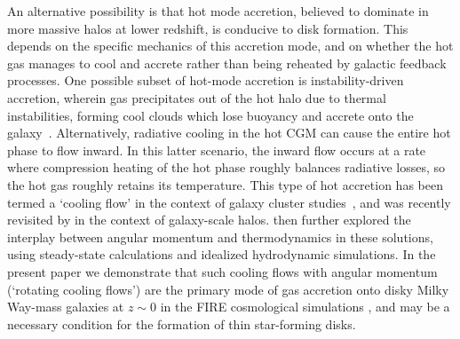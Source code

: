 \documentclass[fleqn,usenatbib]{mnras}
\begin{document}
An alternative possibility is that hot mode accretion, believed to dominate in more massive halos at lower redshift, is conducive to disk formation.
This depends on the specific mechanics of this accretion mode, and on whether the hot gas manages to cool and accrete rather than being reheated by galactic feedback processes.
One possible subset of hot-mode accretion is instability-driven accretion, wherein gas precipitates out of the hot halo due to thermal instabilities, forming cool clouds which lose buoyancy and accrete onto the galaxy~\citep[e.g.][]{Maller2004, Mccourt2012, Voit2015, Armillotta2016, Gronke2019a, Voit2021}.
Alternatively, radiative cooling in the hot CGM can cause the entire hot phase to flow inward.
In this latter scenario, the inward flow occurs at a rate where compression heating of the hot phase roughly balances radiative losses, so the hot gas roughly retains its temperature.
This type of hot accretion has been termed a `cooling flow' in the context of galaxy cluster studies~\citep[][see \citealt{McNamara2007} for a review]{Mathews1978, Cowie1980, Fabian1984, Balbus1988, Bertschinger1989}, and was recently revisited by 
\cite{Stern2019} in the context of galaxy-scale halos.
\cite{Stern2020} then further explored the interplay between angular momentum and thermodynamics in these solutions, using steady-state calculations and idealized hydrodynamic simulations. 
In the present paper we demonstrate that such cooling flows with angular momentum (`rotating cooling flows')
are the primary mode of gas accretion onto disky Milky Way-mass galaxies at $z \sim 0$ in the FIRE cosmological simulations \citep{Hopkins2018}, and may be a necessary condition for the formation of thin star-forming disks.
\end{document}
